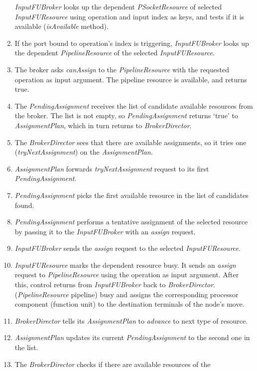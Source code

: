 \documentclass[a4paper,twoside]{tce}
\begin{document}
\begin{enumerate}
  \emph{InputFUBroker} looks up the dependent \emph{PSocketResource} of
  selected \emph{InputFUResource} using operation and input index as keys,
  and tests if it is available (\emph{isAvailable} method).
\item %
  If the port bound to operation's index is triggering, \emph{InputFUBroker}
  looks up the dependent \emph{PipelineResource} of the selected
  \emph{InputFUResource}.
\item %
  The broker asks \emph{canAssign} to the \emph{PipelineResource} with the
  requested operation as input argument. The pipeline resource is available,
  and returns true.
\item %
  The \emph{PendingAssignment} receives the list of candidate available
  resources from the broker. The list is not empty, so
  \emph{PendingAssignment} returns `true' to \emph{AssignmentPlan}, which in
  turn returns to \emph{BrokerDirector}.
\item %
  The \emph{BrokerDirector} sees that there are available assignments, so it
  tries one (\emph{tryNextAssignment}) on the \emph{AssignmentPlan}.
\item %
  \emph{AssignmentPlan} forwards \emph{tryNextAssignment} request to its
  first \emph{PendingAssignment}.
\item %
  \emph{PendingAssignment} picks the first available resource in the list of
  candidates found.
\item %
  \emph{PendingAssignment} performs a tentative assignment of the selected
  resource by passing it to the \emph{InputFUBroker} with an \emph{assign}
  request.
\item %
  \emph{InputFUBroker} sends the \emph{assign} request to the selected
  \emph{InputFUResource}.
\item %
  \emph{InputFUResource} marks the dependent resource busy. It sends an
  \emph{assign} request to \emph{PipelineResource} using the operation as
  input argument. After this, control returns from \emph{InputFUBroker} back
  to \emph{BrokerDirector}. (\emph{PipelineResource} pipeline) busy and
  assigns the corresponding processor component (function unit) to the
  destination terminals of the node's move.
\item %
  \emph{BrokerDirector} tells its \emph{AssignmentPlan} to \emph{advance} to
  next type of resource.
\item %
  \emph{AssignmentPlan} updates its current \emph{PendingAssignment} to the
  second one in the list.
\item %
  The \emph{BrokerDirector} checks if there are available resources of the

\end{enumerate}
\end{document}
